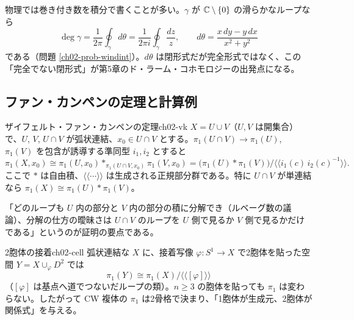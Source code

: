 物理では巻き付き数を積分で書くことが多い。$\gamma$ が $\mathbb{C}\setminus\{0\}$ の滑らかなループなら
\[
\deg\gamma=\frac{1}{2\pi}\oint_\gamma d\theta=\frac{1}{2\pi i}\oint_\gamma\frac{dz}{z},\qquad d\theta=\frac{x\,dy-y\,dx}{x^2+y^2}
\]
である（問題 \ref{ch02-prob-windint}）。$d\theta$ は閉形式だが完全形式ではなく、この「完全でない閉形式」が第5章のド・ラーム・コホモロジーの出発点になる。

\subsection{ファン・カンペンの定理と計算例}

\begin{mythm}{ザイフェルト・ファン・カンペンの定理}{ch02-vk}
$X=U\cup V$（$U,V$ は開集合）で、$U$, $V$, $U\cap V$ が弧状連結、$x_0\in U\cap V$ とする。$\pi_1(U\cap V)\to\pi_1(U)$, $\pi_1(V)$ を包含が誘導する準同型 $i_1,i_2$ とすると
\[
\pi_1(X,x_0)\cong\pi_1(U,x_0)*_{\pi_1(U\cap V,x_0)}\pi_1(V,x_0)
=\bigl(\pi_1(U)*\pi_1(V)\bigr)\big/\bigl\langle\!\bigl\langle i_1(c)\,i_2(c)^{-1}\bigr\rangle\!\bigr\rangle .
\]
ここで $*$ は自由積、$\langle\!\langle\cdots\rangle\!\rangle$ は生成される正規部分群である。特に $U\cap V$ が単連結なら $\pi_1(X)\cong\pi_1(U)*\pi_1(V)$。
\end{mythm}
\begin{note}
「どのループも $U$ 内の部分と $V$ 内の部分の積に分解でき（ルベーグ数の議論）、分解の仕方の曖昧さは $U\cap V$ のループを $U$ 側で見るか $V$ 側で見るかだけである」というのが証明の要点である。
\end{note}

\begin{myprop}{2胞体の接着}{ch02-cell}
弧状連結な $X$ に、接着写像 $\varphi\colon S^1\to X$ で2胞体を貼った空間 $Y=X\cup_\varphi D^2$ では
\[
\pi_1(Y)\cong\pi_1(X)\big/\langle\!\langle[\varphi]\rangle\!\rangle
\]
（$[\varphi]$ は基点へ道でつないだループの類）。$n\ge3$ の胞体を貼っても $\pi_1$ は変わらない。したがって CW 複体の $\pi_1$ は2骨格で決まり、「1胞体が生成元、2胞体が関係式」を与える。
\end{myprop}

